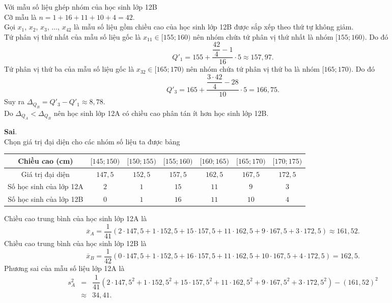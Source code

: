 \begin{ex}
{\begin{itemchoice}
 Với mẫu số liệu ghép nhóm của học sinh lớp 12B\\
 Cỡ mẫu là $n=1+16+11+10+4=42$.
 \\Gọi $x_1$, $x_2$, $x_3$, $\ldots$, $x_{42}$ là mẫu số liệu gồm chiều cao của học sinh lớp 12B được sắp xếp theo thứ tự không giảm.\\
 Tứ phân vị thứ nhất của mẫu số liệu gốc là $x_{11} \in [155; 160)$ nên nhóm chứa tứ phân vị thứ nhất là nhóm $[155; 160)$. Do đó \[Q'_1=155+\dfrac{\dfrac{42}{4}-1}{16}\cdot5\approx 157{,}97.\]
 Tứ phân vị thứ ba của mẫu số liệu gốc là $x_{32} \in [165; 170)$ nên nhóm chứa tứ phân vị thứ ba là nhóm $[165; 170)$. Do đó \[Q'_3=165+\dfrac{\dfrac{3\cdot42}{4}-28}{10}\cdot5=166{,}75.\]
 Suy ra $\Delta_{Q_B}=Q'_3-Q'_1 \approx 8{,}78$.\\
 Do $\Delta_{Q_A} < \Delta_{Q_B}$ nên học sinh lớp 12A có chiều cao phân tán ít hơn học sinh lớp 12B.
 
 \itemch \textbf{Sai}.\\ Chọn giá trị đại diện cho các nhóm số liệu ta được bảng
 \begin{center}
 \begin{tabular}{|c|c|c|c|c|c|c|}
 \hline
 Chiều cao (cm) & $[145; 150)$ & $[150; 155)$ & $[155; 160)$ & $[160; 165)$ & $[165; 170)$ & $[170; 175)$ \\
 \hline
 Giá trị đại diện & $147{,}5$ & $152{,}5$ & $157{,}5$ & $162{,}5$ & $167{,}5$ & $172{,}5$ \\
 \hline
 Số học sinh của lớp 12A & $2$ & $1$ & $15$ & $11$ & $9$ & $3$ \\
 \hline
 Số học sinh của lớp 12B & $0$ & $1$ & $16$ & $11$ & $10$ & $4$ \\
 \hline 
 \end{tabular}
 \end{center}
 Chiều cao trung bình của học sinh lớp 12A là \[\overline{x}_A=\dfrac{1}{41} (2\cdot 147{,}5+1\cdot 152{,}5+15\cdot 157{,}5+11\cdot 162{,}5+9\cdot 167{,}5+3\cdot 172{,}5)\approx 161{,}52.\]
 Chiều cao trung bình của học sinh lớp 12B là \[\overline{x}_B=\dfrac{1}{42} (0\cdot 147{,}5+1\cdot 152{,}5+16\cdot 157{,}5+11\cdot 162{,}5+10\cdot 167{,}5+4\cdot 172{,}5)=162{,}5.\]
 Phương sai của mẫu số liệu lớp 12A là
 \begin{eqnarray*}
 s_A^2&=&\dfrac{1}{41} \left(2\cdot 147{,}5^2+1\cdot 152{,}5^2+15\cdot 157{,}5^2+11\cdot 162{,}5^2+9\cdot 167{,}5^2+3\cdot 172{,}5^2\right)-\left(161{,}52\right)^2\\&\approx& 34{,}41.
 \end{eqnarray*}
 

\end{itemchoice}}
\end{ex}
